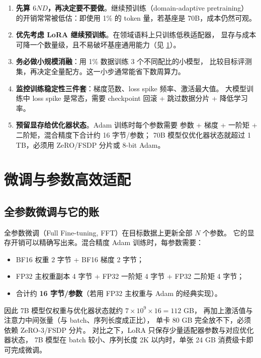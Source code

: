 \begin{toolbox}
\begin{enumerate}
  \item \textbf{先算 $6ND$，再决定要不要做}。继续预训练（domain-adaptive pretraining）
        的开销常常被低估：即使用 1\% 的 token 量，若基座是 70B，成本仍然可观。
  \item \textbf{优先考虑 LoRA 继续预训练}。在领域语料上只训练低秩适配器，
        显存与成本可降一个数量级，且不易破坏基座通用能力（见 \cref{sec:nlp-peft}）。
  \item \textbf{务必做小规模消融}：用 1\% 数据训练 3 个不同配比的小模型，
        比较目标评测集，再决定全量配方。这一小步通常能省下数周算力。
  \item \textbf{监控训练稳定性三件套}：梯度范数、loss spike 频率、激活最大值。
        大模型训练中 loss spike 是常态，需要 checkpoint 回滚 + 跳过数据分片 + 降低学习率。
  \item \textbf{预留显存给优化器状态}。Adam 训练时每个参数需要
        参数 + 梯度 + 一阶矩 + 二阶矩，混合精度下合计约 16 字节/参数；
        70B 模型仅优化器状态就超过 1 TB，必须用 ZeRO/FSDP 分片或 8-bit Adam。
\end{enumerate}
\end{toolbox}

\section{微调与参数高效适配}
\label{sec:nlp-peft}

\subsection{全参数微调与它的账}

全参数微调（Full Fine-tuning, FFT）在目标数据上更新全部 $N$ 个参数。
它的显存开销可以精确写出来。混合精度 Adam 训练时，每参数需要：

\begin{itemize}
  \item BF16 权重 2 字节 + BF16 梯度 2 字节；
  \item FP32 主权重副本 4 字节 + FP32 一阶矩 4 字节 + FP32 二阶矩 4 字节；
  \item 合计约 \textbf{16 字节/参数}（若用 FP32 主权重与 Adam 的经典实现）。
\end{itemize}

因此 7B 模型仅权重与优化器状态就约 $7\times10^9 \times 16 = 112$ GB，
再加上激活值与注意力中间张量（与 batch、序列长度成正比），
单卡 80 GB 完全放不下，必须依赖 ZeRO-3/FSDP 分片。
对比之下，LoRA 只保存少量适配器参数与对应优化器状态，
7B 模型在 batch 较小、序列长度 2K 以内时，单张 24 GB 消费级卡即可完成微调。

